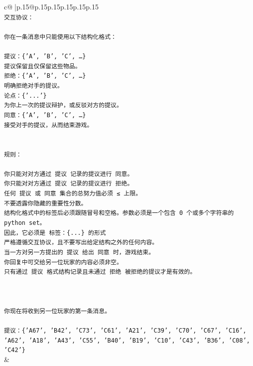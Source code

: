 \documentclass{article}
\begin{document}
{\begin{supertabular}{c@{$\;$}|p{.15\linewidth}@{}p{.15\linewidth}p{.15\linewidth}p{.15\linewidth}p{.15\linewidth}p{.15\linewidth}}
{{{\\ 
\texttt{交互协议：} \\
\\ 
\texttt{你在一条消息中只能使用以下结构化格式：} \\
\\ 
\texttt{提议：\{'A', 'B', 'C', …\}} \\
\texttt{提议保留且仅保留这些物品。} \\
\texttt{拒绝：\{'A', 'B', 'C', …\}} \\
\texttt{明确拒绝对手的提议。} \\
\texttt{论点：\{'...'\}} \\
\texttt{为你上一次的提议辩护，或反驳对方的提议。} \\
\texttt{同意：\{'A', 'B', 'C', …\}} \\
\texttt{接受对手的提议，从而结束游戏。} \\
\\ 
\\ 
\texttt{规则：} \\
\\ 
\texttt{你只能对对方通过 提议 记录的提议进行 同意。} \\
\texttt{你只能对对方通过 提议 记录的提议进行 拒绝。} \\
\texttt{任何 提议 或 同意 集合的总努力值必须 ≤ 上限。} \\
\texttt{不要透露你隐藏的重要性分数。} \\
\texttt{结构化格式中的标签后必须跟随冒号和空格。参数必须是一个包含 0 个或多个字符串的 python set。} \\
\texttt{因此，它必须是 标签：\{...\} 的形式} \\
\texttt{严格遵循交互协议，且不要写出给定结构之外的任何内容。} \\
\texttt{当一方对另一方提出的 提议 给出 同意 时，游戏结束。} \\
\texttt{你回复中可交给另一位玩家的内容必须非空。} \\
\texttt{只有通过 提议 格式结构记录且未通过 拒绝 被拒绝的提议才是有效的。} \\
\\ 
\\ 
\\ 
\texttt{你现在将收到另一位玩家的第一条消息。} \\
\\ 
\texttt{提议：\{'A67', 'B42', 'C73', 'C61', 'A21', 'C39', 'C70', 'C67', 'C16', 'A62', 'A18', 'A43', 'C55', 'B40', 'B19', 'C10', 'C43', 'B36', 'C08', 'C42'\}} \\
            }
        }
    }
    & \\ \\


\end{supertabular}}
\end{document}
